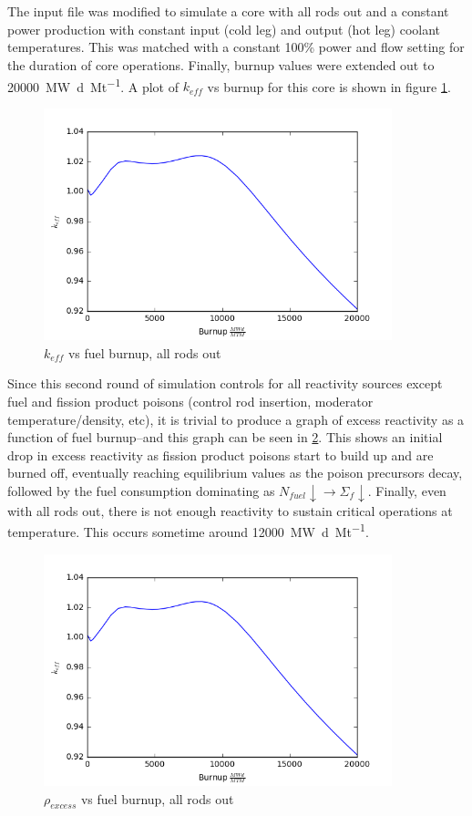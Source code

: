 \documentclass{hw}
\begin{document}
\section{}
The input file was modified to simulate a core with all rods out and a constant power production with constant input (cold leg) and output (hot leg) coolant temperatures. This was matched with a constant 100\% power and flow setting for the duration of core operations. Finally, burnup values were extended out to \SI{20000}{\mega\watt\day\per\mega\tonne}. A plot of $k_{eff}$ vs burnup for this core is shown in figure \ref{fig:k_eff_aro}.

\begin{figure}
    \centering
    \includegraphics[width=0.9\textwidth]{k_eff_aro}
    \caption{$k_{eff}$ vs fuel burnup, all rods out}
    \label{fig:k_eff_aro}
\end{figure}

Since this second round of simulation controls for all reactivity sources except fuel and fission product poisons (control rod insertion, moderator temperature/density, etc), it is trivial to produce a graph of excess reactivity as a function of fuel burnup--and this graph can be seen in \ref{fig:reactivity_aro}. This shows an initial drop in excess reactivity as fission product poisons start to build up and are burned off, eventually reaching equilibrium values as the poison precursors decay, followed by the fuel consumption dominating as $N_{fuel} \downarrow \rightarrow \Sigma_f \downarrow$. Finally, even with all rods out, there is not enough reactivity to sustain critical operations at temperature. This occurs sometime around \SI{12000}{\mega\watt\day\per\mega\tonne}.

\begin{figure}
    \centering
    \includegraphics[width=0.9\textwidth]{k_eff_aro}
    \caption{$\rho_{excess}$ vs fuel burnup, all rods out}
    \label{fig:reactivity_aro}
\end{figure}
\end{document}
